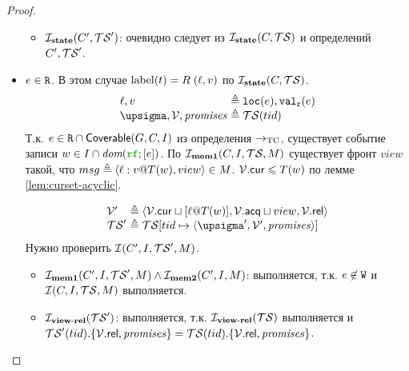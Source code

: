 \begin{proof}
\begin{itemize}
\begin{itemize}
        \item $\mathcal{I}_{\rm \bf state}(C', \mathcal{TS}')$:
          очевидно следует из $\mathcal{I}_{\rm \bf state}(C, \mathcal{TS})$ и определений $C', \mathcal{TS}'$.
      \end{itemize}
        \item $e \in {\mathtt{R}}$. 
          В этом случае ${\rm label}(t) = R \; (\ell, v)$ по $\mathcal{I}_{\rm \bf state}(C, \mathcal{TS})$.
          \[\begin{array}{l@{~}l}
            \loc, \val       & \defeq \lLOC(e), \lVALR(e) \\
            {\pstate, \View, \PromSet} & \defeq \TSf(tid) \\
          \end{array}\]
          Т.к. $e \in {\mathtt{R}} \cap {\sf Coverable}(G, C, I)$ из определения $\rightarrow_{\rm TC}$,
          существует событие записи $w \in \IssuedSet \cap \dom{\lRF; [e]}$. По $\mathcal{I}_{\rm \bf mem1}(C, I, \mathcal{TS}, M)$
          существует фронт $view$ такой, что $msg \defeq \msg{\loc}{\val}{T(w)}{view} \in M$.
          $\mathcal{V}.{\sf cur} \leqslant T(w)$ по лемме \ref{lem:curset-acyclic}.

          \[\begin{array}{l@{~}l}
            \View'   & \defeq \tup{\View.\viewCur \sqcup [\loc @ T(w)], \View.\viewAcq \sqcup view, \View.\viewRel} \\
            \TSf'    & \defeq \TSf[tid \mapsto \tup{\pstate', \View', \PromSet}] \\
          \end{array}\]
          Нужно проверить $\mathcal{I}(C', I, \mathcal{TS}', M)$.
        \begin{itemize}
        \item $\mathcal{I}_{\rm \bf mem1}(C', I, \mathcal{TS}', M) \land \mathcal{I}_{\rm \bf mem2}(C', I, M)$:
          выполняется, т.к. $e \not\in {\mathtt{W}}$ и $\mathcal{I}(C, I, \mathcal{TS}, M)$ выполняется.

        \item $\mathcal{I}_{\rm \bf view\text{-}rel}(\mathcal{TS}')$: выполняется, т.к. $\mathcal{I}_{\rm \bf view\text{-}rel}(\mathcal{TS})$ выполняется и\\
          $\mathcal{TS}'(tid).\{\mathcal{V}.{\sf rel}, \mathit{promises}\} = \mathcal{TS}(tid).\{\mathcal{V}.{\sf rel}, \mathit{promises}\}$.


\end{itemize}
\end{itemize}
\end{proof}
